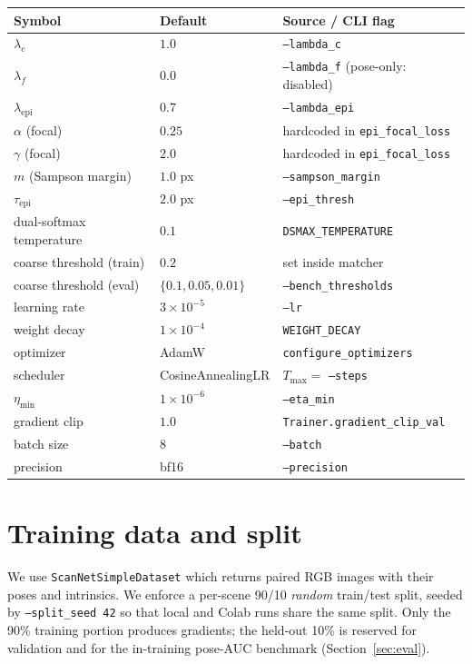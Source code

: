 \documentclass[11pt]{article}
\begin{document}
\begin{center}
\begin{tabular}{lll}
\toprule
Symbol & Default & Source / CLI flag \\
\midrule
$\lambda_c$           & $1.0$   & \texttt{--lambda\_c} \\
$\lambda_f$           & $0.0$   & \texttt{--lambda\_f} (pose-only: disabled) \\
$\lambda_{\text{epi}}$ & $0.7$   & \texttt{--lambda\_epi} \\
$\alpha$ (focal)      & $0.25$  & hardcoded in \texttt{epi\_focal\_loss} \\
$\gamma$ (focal)      & $2.0$   & hardcoded in \texttt{epi\_focal\_loss} \\
$m$ (Sampson margin)  & $1.0$ px & \texttt{--sampson\_margin} \\
$\tau_{\text{epi}}$   & $2.0$ px & \texttt{--epi\_thresh} \\
dual-softmax temperature & $0.1$ & \texttt{DSMAX\_TEMPERATURE} \\
coarse threshold (train) & $0.2$ & set inside matcher \\
coarse threshold (eval)  & $\{0.1, 0.05, 0.01\}$ & \texttt{--bench\_thresholds} \\
\midrule
learning rate         & $3\times 10^{-5}$ & \texttt{--lr} \\
weight decay          & $1\times 10^{-4}$ & \texttt{WEIGHT\_DECAY} \\
optimizer             & AdamW & \texttt{configure\_optimizers} \\
scheduler             & CosineAnnealingLR & $T_{\max} = $ \texttt{--steps} \\
$\eta_{\min}$         & $1\times 10^{-6}$ & \texttt{--eta\_min} \\
gradient clip         & $1.0$ & \texttt{Trainer.gradient\_clip\_val} \\
batch size            & $8$     & \texttt{--batch} \\
precision             & bf16    & \texttt{--precision} \\
\bottomrule
\end{tabular}
\end{center}

\section{Training data and split}

We use \texttt{ScanNetSimpleDataset} which returns paired RGB images
with their poses and intrinsics. We enforce a per-scene \num{90}/\num{10}
\emph{random} train/test split, seeded by \texttt{--split\_seed 42} so
that local and Colab runs share the same split. Only the \num{90}\%
training portion produces gradients; the held-out \num{10}\% is reserved
for validation and for the in-training pose-AUC benchmark
(Section~\ref{sec:eval}).
\end{document}
